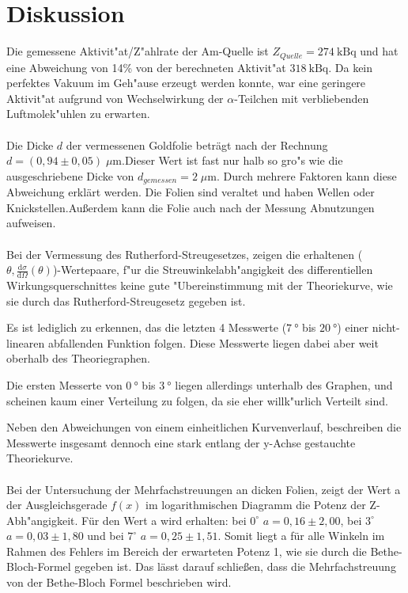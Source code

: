 \section{Diskussion}
\label{sec:Diskussion}
  Die gemessene Aktivit"at/Z"ahlrate der Am-Quelle ist $Z_{Quelle}=\SI{274}{\kilo \becquerel}$ und hat eine Abweichung von 14\% von der berechneten Aktivit"at $\SI{318}{\kilo \becquerel}$.
  Da kein perfektes Vakuum im Geh"ause erzeugt werden konnte, war eine geringere Aktivit"at aufgrund von Wechselwirkung der $\alpha$-Teilchen mit verbliebenden Luftmolek"uhlen zu erwarten.\\
  \\Die Dicke $d$ der vermessenen Goldfolie beträgt nach der Rechnung $d=(0,94 \pm 0,05)\; \mu \text{m}$.Dieser Wert ist fast nur halb so gro"s wie die ausgeschriebene Dicke von $d_{gemessen}=2\; \mu \text{m}$. Durch mehrere Faktoren kann diese Abweichung erklärt werden. Die Folien sind veraltet und haben Wellen oder Knickstellen.Außerdem kann die Folie auch nach der Messung Abnutzungen aufweisen. \\
  \\Bei der Vermessung des Rutherford-Streugesetzes, zeigen die erhaltenen ($\theta,\frac{\text{d}\sigma}{\text{d}\Omega}(\theta)$)-Wertepaare, f"ur die Streuwinkelabh"angigkeit des differentiellen Wirkungsquerschnittes keine gute "Ubereinstimmung mit der Theoriekurve, wie sie durch das Rutherford-Streugesetz gegeben ist.

  Es ist lediglich zu erkennen, das die letzten 4 Messwerte ($\SI{7}{\degree}$ bis $\SI{20}{\degree}$) einer nicht-linearen abfallenden Funktion folgen.
  Diese Messwerte liegen dabei aber weit oberhalb des Theoriegraphen.

  Die ersten Messerte von $\SI{0}{\degree}$ bis $\SI{3}{\degree}$ liegen allerdings unterhalb des Graphen, und scheinen kaum einer Verteilung zu folgen, da sie eher willk"urlich Verteilt sind.

  Neben den Abweichungen von einem einheitlichen Kurvenverlauf, beschreiben die Messwerte insgesamt dennoch eine stark entlang der y-Achse gestauchte Theoriekurve.\\
 \\Bei der Untersuchung der Mehrfachstreuungen an dicken Folien, zeigt der Wert a der Ausgleichsgerade $f(x)$ im logarithmischen Diagramm die Potenz der Z-Abh"angigkeit. Für den Wert a wird erhalten: bei $0^\circ$ $a=0,16 \pm 2,00$, bei $3^\circ$ $a=0,03 \pm 1,80$ und bei $7^\circ$ $a=0,25 \pm 1,51$. Somit liegt a für alle Winkeln im Rahmen des Fehlers im Bereich der erwarteten Potenz 1, wie sie durch die Bethe-Bloch-Formel gegeben ist. Das lässt darauf schließen, dass die Mehrfachstreuung von der Bethe-Bloch Formel beschrieben wird.
